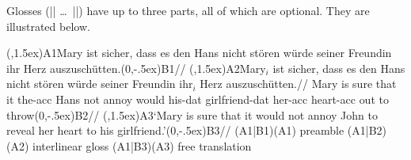 
Glosses (|\begingl| \dots\ |\endgl|) have up to three parts, all of
which are optional. They are illustrated below.

\begingroup

\ex \hsize=4in
\def\TOP{\pnode(\hsize,1.5ex)}%
\def\BOT{\pnode(0,-.5ex)}%
\begingl
\glpreamble \TOP{A1}Mary ist sicher, dass es den Hans nicht st\"oren w\"urde
seiner Freundin ihr Herz auszusch\"utten.\BOT{B1}//
\gla \TOP{A2}Mary$_i$ ist sicher, dass es den Hans nicht st\"oren w\"urde
seiner Freundin ihr$_i$ Herz auszusch\"utten.//
\glb Mary is sure that it the-{\sc acc} Hans not annoy would
his-{\sc dat} girlfriend-{\sc dat} her-{\sc acc} heart-{\sc acc} {out to
throw}\BOT{B2}//
\glft  \TOP{A3}`Mary is sure that it would not annoy John to reveal her
heart to his girlfriend.'\BOT{B3}//
\endgl
\SpecialCoor
\psbrace[ref=lC](A1|B1)(A1){ preamble}
\psbrace[ref=lC](A1|B2)(A2){ interlinear gloss}
\psbrace[ref=lC](A1|B3)(A3){ free translation}
\xe
\endgroup

%
%

